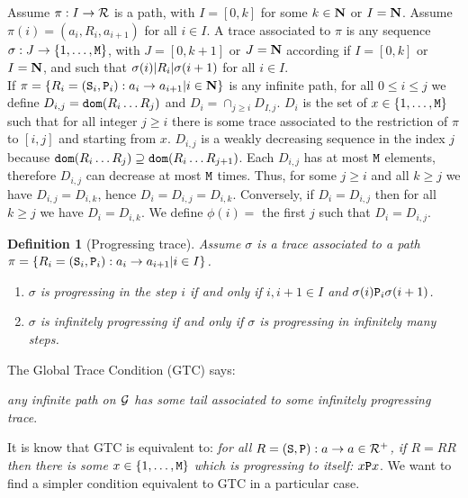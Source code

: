 \documentclass{lmcs}
\newtheorem{definition}[theorem]{Definition}
\begin{document}
Assume $\pi: I \rightarrow {\mathcal R}$ is a path, with  $I=[0,k]$ for some $k \in {\bf N}$ or $I={\bf N}$.
Assume $\pi(i)=(a_i,R_i,a_{i+1})$ for all $i \in I$. A trace associated to $\pi$
is any sequence $\sigma : J \rightarrow \{1, \ldots, {\tt M}\}$, with $J=[0,k+1]$ or $J={\bf N}$ according
if $I=[0,k]$ or $I={\bf N}$,
and such that $\sigma(i) {| R_i |} \sigma(i+1)$ for all $i \in I$. 
\\

If $\pi = \{ R_i = ({\tt S}_i,{\tt P}_i):a_i \rightarrow a_{i+1} | i \in {\bf N}\} $ is any infinite path, for all $0 \le i \le j$ we define $D_{i,j} = {\tt dom}(R_i \ldots R_j)$ and $D_{i} = \cap_{j \ge i} D_{I,j}$. $D_i$ is the set of $x \in \{1, \ldots, {\tt M}\}$ such that for all integer $j \ge i$ there is some trace associated to the restriction of $\pi$ to $[i,j]$ and starting from $x$. $D_{i,j}$ is a weakly decreasing sequence in the index $j$ because ${\tt dom}(R_i \ldots R_j) \supseteq {\tt dom}(R_i \ldots R_{j+1})$. Each $D_{i,j}$ has at most ${\tt M}$ elements, therefore $D_{i,j}$  can decrease at most ${\tt M}$ times. Thus, for some $j \ge i$ and all $k \ge j$ we have $D_{i,j} = D_{i,k}$, hence $D_i = D_{i,j} = D_{i,k}$. Conversely, if $D_i = D_{i,j}$ then for all $k \ge j$ we have $D_i = D_{i,k}$. We define $\phi(i) = $ the first $j$ such that $D_i = D_{i,j}$.
\\

\begin{definition}[Progressing trace]
\label{definition-progressing-trace}
Assume $\sigma$ is a trace associated to a path $\pi = \{ R_i = ({\tt S}_i,{\tt P}_i):a_i \rightarrow a_{i+1} | i \in I\} $.
\begin{enumerate}
\item
$\sigma$ is progressing in the step $i$ if and only if  $i, i+1 \in I$ and $\sigma(i) {\tt P}_i \sigma(i+1)$. \item
$\sigma$ is infinitely progressing if and only if $\sigma$ is progressing in infinitely many steps.  
\end{enumerate}
\end{definition}

The Global Trace Condition (GTC) says: 

\begin{center}
\emph{any infinite path on ${\mathcal G}$ has some tail associated to some infinitely progressing trace}. 
\end{center}

It is know that GTC is equivalent to: \emph{for all $R = ({\tt S},{\tt P}) : a \rightarrow a \in {\mathcal R}^+$, if $R=RR$ then there is some $x \in \{1, \ldots, {\tt M}\}$ which is progressing to itself: $x {\tt P} x$}. We want to find a simpler condition equivalent to GTC in a particular case.
\end{document}
